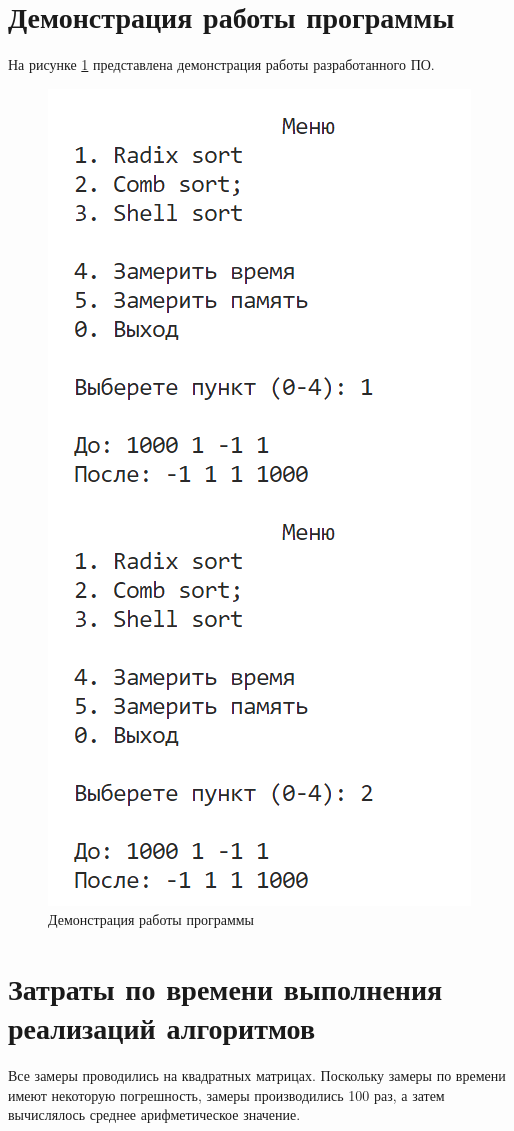\section{Демонстрация работы программы}
На рисунке \ref{img:demonstration} представлена демонстрация работы разработанного ПО.  
\begin{figure}[h]
	\centering
	\includegraphics[height=0.3\textheight]{img/prog_work.png}
	\caption{Демонстрация работы программы}
	\label{img:demonstration}
\end{figure}

\section{Затраты по времени выполнения реализаций алгоритмов}
Все замеры проводились на квадратных матрицах. Поскольку замеры по времени имеют некоторую погрешность, замеры производились 100 раз, а затем вычислялось среднее арифметическое значение.

